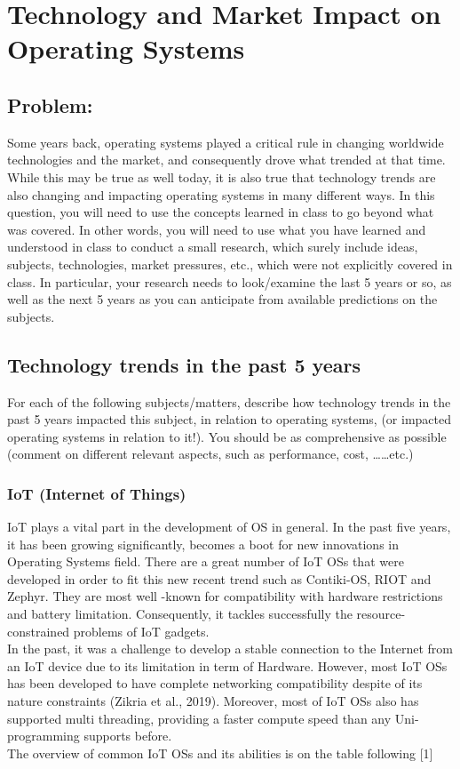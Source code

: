 \newpage
\section{Technology and Market Impact on Operating Systems}
\subsection{Problem:}
Some years back, operating systems played a critical rule in changing worldwide technologies and the
market, and consequently drove what trended at that time. While this may be true as well today, it is also
true that technology trends are also changing and impacting operating systems in many different ways. In
this question, you will need to use the concepts learned in class to go beyond what was covered. In other
words, you will need to use what you have learned and understood in class to conduct a small research,
which surely include ideas, subjects, technologies, market pressures, etc., which were not explicitly
covered in class. In particular, your research needs to look/examine the last 5 years or so, as well as the
next 5 years as you can anticipate from available predictions on the subjects.

\newpage
\subsection{Technology trends in the past 5 years}
For each of the following subjects/matters, describe how technology trends in the past 5 years
impacted this subject, in relation to operating systems, (or impacted operating systems in
relation to it!). You should be as comprehensive as possible (comment on different relevant
aspects, such as performance, cost, ……etc.)

\subsubsection{IoT (Internet of Things)}

IoT plays a vital part in the development of OS in general. In the past five years, it has been growing significantly, becomes a boot for new innovations in Operating Systems field. 
There are a great number of IoT OSs that were developed in order to fit this new recent trend such as Contiki-OS, RIOT and Zephyr. They are most well -known for compatibility with hardware restrictions and battery limitation. 
Consequently, it tackles successfully the resource-constrained problems of IoT gadgets.  \\
In the past, it was a challenge to develop a stable connection to the Internet from an IoT device due to its limitation in term of Hardware. However, most IoT OSs has been developed to have complete networking compatibility despite of its nature constraints (Zikria et al., 2019). Moreover, most of IoT OSs also has supported multi threading, providing a faster compute speed than any Uni-programming supports before. \\
The overview of common IoT OSs and its abilities is on the table following [1]

